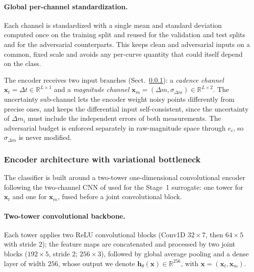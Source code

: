 \documentclass{aa}
\begin{document}
\paragraph{Global per-channel standardization.} Each channel is standardized with a single mean and standard deviation computed once on the training split and reused for the validation and test splits and for the adversarial counterparts. This keeps clean and adversarial inputs on a common, fixed scale and avoids any per-curve quantity that could itself depend on the class.

The encoder receives two input branches (Sect.~\ref{sec:encoder}): a \emph{cadence channel} $\mathbf{x}_t = \Delta t \in \mathbb{R}^{L \times 1}$ and a \emph{magnitude channel} $\mathbf{x}_m = (\Delta m, \sigma_{\Delta m}) \in \mathbb{R}^{L \times 2}$. The uncertainty sub-channel lets the encoder weight noisy points differently from precise ones, and keeps the differential input self-consistent, since the uncertainty of $\Delta m_i$ must include the independent errors of both measurements. The adversarial budget is enforced separately in raw-magnitude space through $e_i$, so $\sigma_{\Delta m}$ is never modified.

\subsubsection{Encoder architecture with variational bottleneck} \label{sec:encoder}

The classifier is built around a two-tower one-dimensional convolutional encoder following the two-channel CNN of \citet{aguirre2019deep} used for the Stage~1 surrogate: one tower for $\mathbf{x}_t$ and one for $\mathbf{x}_m$, fused before a joint convolutional block.

\paragraph{Two-tower convolutional backbone.} Each tower applies two ReLU convolutional blocks (Conv1D $32{\times}7$, then $64{\times}5$ with stride 2); the feature maps are concatenated and processed by two joint blocks ($192{\times}5$, stride 2; $256{\times}3$), followed by global average pooling and a dense layer of width $256$, whose output we denote $\mathbf{h}_\theta(\mathbf{x}) \in \mathbb{R}^{256}$, with $\mathbf{x} = (\mathbf{x}_t, \mathbf{x}_m)$.
\end{document}
